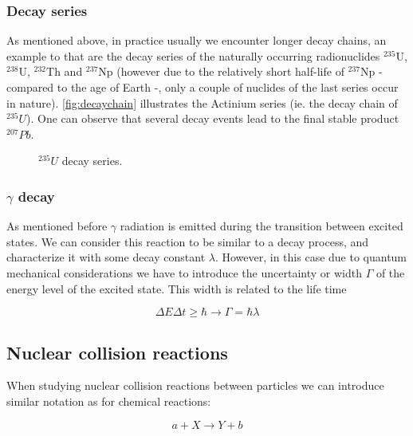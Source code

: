 \subsubsection*{Decay series}

As mentioned above, in practice usually we encounter longer decay chains, an example to that are the decay series of the naturally occurring radionuclides ${}^{235}\text{U}$, ${}^{238}\text{U}$, ${}^{232}\text{Th}$ and ${}^{237}\text{Np}$ (however due to the relatively short half-life of ${}^{237}\text{Np}$ - compared to the age of Earth -, only a couple of nuclides of the last series occur in nature). \autoref{fig:decaychain} illustrates the Actinium series (ie. the decay chain of ${}^{235}U$). One can observe that several decay events lead to the final stable product ${}^{207}Pb$.


\begin{figure}[ht!]
\protect {}\protect
\caption{\label{fig:decaychain} \footnotesize{${}^{235}U$ decay series.}}
\end{figure}

\subsubsection*{$\gamma$ decay}

As mentioned before $\gamma$ radiation is emitted during the transition between excited states. We can consider this reaction to be similar to a decay process, and characterize it with some decay constant $\lambda$. However, in this case due to quantum mechanical considerations we have to introduce the uncertainty or width $\Gamma$ of the energy level of the excited state. This width is related to the life time

\begin{equation}
\Delta E \Delta t \geq \hbar \rightarrow \Gamma=\hbar \lambda
\end{equation}

\subsection{Nuclear collision reactions}

When studying nuclear collision reactions between particles we can introduce similar notation as for chemical reactions:

\begin{equation}\label{eq:reaction}
a+X \rightarrow Y+b
\end{equation}

